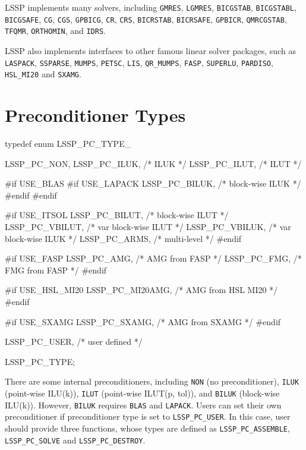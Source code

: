 LSSP implements many solvers,
     including \verb|GMRES|, \verb|LGMRES|, \verb|BICGSTAB|, \verb|BICGSTABL|, \verb|BICGSAFE|,
     \verb|CG|, \verb|CGS|, \verb|GPBICG|, \verb|CR|, \verb|CRS|, \verb|BICRSTAB|,
     \verb|BICRSAFE|, \verb|GPBICR|, \verb|QMRCGSTAB|, \verb|TFQMR|, \verb|ORTHOMIN|, and \verb|IDRS|.

LSSP also implements interfaces to other famous linear solver packages, such as
\verb|LASPACK|, \verb|SSPARSE|, \verb|MUMPS|, \verb|PETSC|, \verb|LIS|, \verb|QR_MUMPS|,
\verb|FASP|, \verb|SUPERLU|, \verb|PARDISO|, \verb|HSL_MI20| and \verb|SXAMG|.

\section{Preconditioner Types}
\begin{evb}
typedef enum LSSP_PC_TYPE_
{
    LSSP_PC_NON,
    LSSP_PC_ILUK,               /* ILUK */
    LSSP_PC_ILUT,               /* ILUT */

#if USE_BLAS
#if USE_LAPACK
    LSSP_PC_BILUK,              /* block-wise ILUK */
#endif
#endif

#if USE_ITSOL
    LSSP_PC_BILUT,              /* block-wise ILUT */
    LSSP_PC_VBILUT,             /* var block-wise ILUT */
    LSSP_PC_VBILUK,             /* var block-wise ILUK */
    LSSP_PC_ARMS,               /* multi-level */
#endif

#if USE_FASP
    LSSP_PC_AMG,                /* AMG from FASP */
    LSSP_PC_FMG,                /* FMG from FASP */
#endif

#if USE_HSL_MI20
    LSSP_PC_MI20AMG,            /* AMG from HSL MI20 */
#endif

#if USE_SXAMG
    LSSP_PC_SXAMG,              /* AMG from SXAMG */
#endif

    LSSP_PC_USER,               /* user defined */

} LSSP_PC_TYPE;

\end{evb}

There are some internal preconditioners, including \verb|NON| (no preconditioner),
\verb|ILUK| (point-wise ILU(k)), \verb|ILUT| (point-wise ILUT(p, tol)),
and \verb|BILUK| (block-wise ILU(k)). However, \verb|BILUK| requires \verb|BLAS| and \verb|LAPACK|.
Users can set their own preconditioner if preconditioner type is set to \verb|LSSP_PC_USER|.
In this case, user should provide three functions, whose types are defined as
\verb|LSSP_PC_ASSEMBLE|, \verb|LSSP_PC_SOLVE| and \verb|LSSP_PC_DESTROY|.

